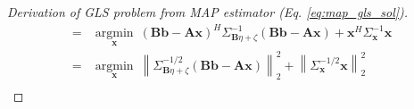 \documentclass[11pt]{article}
\begin{document}
\begin{proof}[Derivation of GLS problem from MAP estimator (Eq. \ref{eq:map_gls_sol})]
\begin{equation*}
\begin{aligned}
            = & \underset{\mathbf{x}}{\operatorname{argmin}}\
            (\mathbf{Bb} - \mathbf{A}\mathbf{x})^H\Sigma_{\mathbf{B}\eta + \zeta}^{-1}(\mathbf{Bb} - \mathbf{A}\mathbf{x})
            + \mathbf{x}^H\Sigma_{\mathbf{x}}^{-1}\mathbf{x}\\
            = & \underset{\mathbf{x}}{\operatorname{argmin}}\
            \left\|\Sigma_{\mathbf{B}\eta + \zeta}^{-1/2}(\mathbf{Bb} - \mathbf{A}\mathbf{x})\right\|_2^2
            + \left\|\Sigma_{\mathbf{x}}^{-1/2}\mathbf{x}\right\|_2^2\\
        \end{aligned}
    \end{equation*}
\end{proof}


\end{document}
